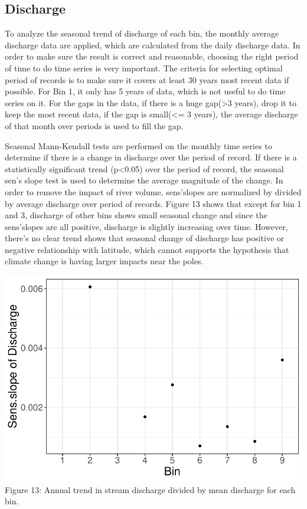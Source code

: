\documentclass[12pt,]{article}
\begin{document}
\hypertarget{discharge-2}{%
\subsection{Discharge}\label{discharge-2}}

To analyze the seasonal trend of discharge of each bin, the monthly
average discharge data are applied, which are calculated from the daily
discharge data. In order to make sure the result is correct and
reasonable, choosing the right period of time to do time series is very
important. The criteria for selecting optimal period of records is to
make sure it covers at least 30 years most recent data if possible. For
Bin 1, it only has 5 years of data, which is not useful to do time
series on it. For the gaps in the data, if there is a huge
gap(\textgreater{}3 years), drop it to keep the most recent data, if the
gap is small(\textless{}= 3 years), the average discharge of that month
over periods is used to fill the gap.

Seasonal Mann-Kendall tests are performed on the monthly time series to
determine if there is a change in discharge over the period of record.
If there is a statistically significant trend (p\textless{}0.05) over
the period of record, the seasonal sen's slope test is used to determine
the average magnitude of the change. In order to remove the impact of
river volume, sens'slopes are normalized by divided by average discharge
over period of records. Figure 13 shows that except for bin 1 and 3,
discharge of other bins shows small seasonal change and since the
sens'slopes are all positive, discharge is slightly increasing over
time. However, there's no clear trend shows that seasonal change of
discharge has positive or negative relationship with latitude, which
cannot supports the hypothesis that climate change is having larger
impacts near the poles.

\includegraphics{Project_Report_v2_files/figure-latex/Discharge Seasonal Change Analysis 4-1.pdf}
Figure 13: Annual trend in stream discharge divided by mean discharge
for each bin.
\end{document}
